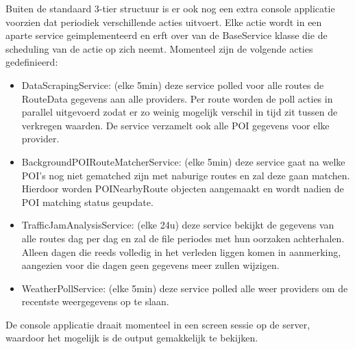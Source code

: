 Buiten de standaard 3-tier structuur is er ook nog een extra console applicatie voorzien dat periodiek verschillende acties uitvoert. Elke actie wordt in een aparte service geimplementeerd en erft over van de BaseService klasse die de scheduling van de actie op zich neemt. Momenteel zijn de volgende acties gedefinieerd:
\begin{itemize}
\item DataScrapingService: (elke 5min) deze service polled voor alle routes de RouteData gegevens aan alle providers. Per route worden de poll acties in parallel uitgevoerd zodat er zo weinig mogelijk verschil in tijd zit tussen de verkregen waarden. De service verzamelt ook alle POI gegevens voor elke provider.
\item BackgroundPOIRouteMatcherService: (elke 5min) deze service gaat na welke POI's nog niet gematched zijn met naburige routes en zal deze gaan matchen. Hierdoor worden POINearbyRoute objecten aangemaakt en wordt nadien de POI matching status geupdate.
\item TrafficJamAnalysisService: (elke 24u) deze service bekijkt de gegevens van alle routes dag per dag en zal de file periodes met hun oorzaken achterhalen. Alleen dagen die reeds volledig in het verleden liggen komen in aanmerking, aangezien voor die dagen geen gegevens meer zullen wijzigen.
\item WeatherPollService: (elke 5min) deze service polled alle weer providers om de recentste weergegevens op te slaan.
\end{itemize}

De console applicatie draait momenteel in een screen sessie op de server, waardoor het mogelijk is de output gemakkelijk te bekijken.